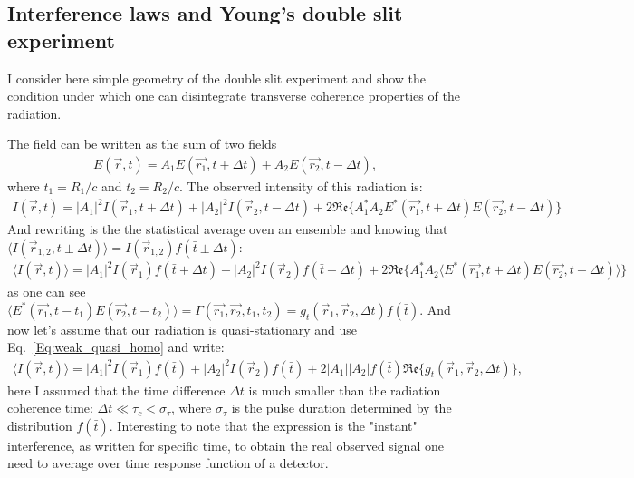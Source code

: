 \subsection{Interference laws and Young's double slit experiment}
    I consider here simple geometry of the double slit experiment and show the condition under which one can disintegrate transverse coherence properties of the radiation. 
    
    The field can be written as the sum of two fields 
    \begin{align}
        E(\vec{r}, t) = A_1 E(\vec{r_1}, t + \Delta t) + A_2 E(\vec{r_2}, t - \Delta t), 
    \end{align}
    where $t_1 = R_1/c$ and $t_2 = R_2/c$. The observed intensity of this radiation is:
    \begin{align}
        I(\vec{r}, t) = |A_1|^2 I(\vec{r}_1, t + \Delta t) + |A_2|^2 I(\vec{r}_2, t - \Delta t) + 
        2 \mathfrak{Re} \{ A_1^* A_2 E^*(\vec{r_1}, t + \Delta t) E(\vec{r_2}, t - \Delta t) \}
    \end{align}
    And rewriting is the the statistical average oven an ensemble and knowing that $\langle I(\vec{r}_{1,2}, t \pm \Delta t) \rangle = I(\vec{r}_{1,2})f(\bar{t} \pm \Delta t)$:
    \begin{align}
        \langle I(\vec{r}, t) \rangle = 
        |A_1|^2 I(\vec{r}_{1})f(\bar{t} + \Delta t) + 
        |A_2|^2 I(\vec{r}_{2})f(\bar{t} - \Delta t) + 
        2 \mathfrak{Re} \{ A_1^* A_2 \langle E^*(\vec{r_1}, t + \Delta t) E(\vec{r_2}, t - \Delta t) \rangle\}
    \end{align}
    as one can see $\langle E^*(\vec{r_1}, t - t_1) E(\vec{r_2}, t - t_2) \rangle = \Gamma (\vec{r_1}, \vec{r_2}, t_1, t_2) = g_t(\vec{r}_1, \vec{r}_2, \Delta t) f(\bar{t})$. 
    And now let's assume that our radiation is quasi-stationary and use Eq.~\ref{Eq:weak_quasi_homo} and write:
    \begin{align}
        \langle I(\vec{r}, t) \rangle = 
        |A_1|^2 I(\vec{r}_{1})f(\bar{t}) + 
        |A_2|^2 I(\vec{r}_{2})f(\bar{t}) + 2|A_1| |A_2| f(\bar{t}) \mathfrak{Re} \big\{ g_t(\vec{r}_1, \vec{r}_2, \Delta t)\big\},
    \end{align}
    here I assumed that the time difference $\Delta t$ is much smaller than the radiation coherence time: $\Delta t \ll \tau_c < \sigma_{\tau}$, where $ \sigma_{\tau}$ is the pulse duration determined by the distribution $f(\bar{t})$. Interesting to note that the expression is the "instant" interference, as written for specific time, to obtain the real observed signal one need to average over time response function of a detector.

